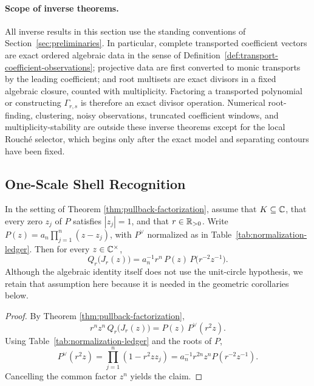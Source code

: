 \paragraph{Scope of inverse theorems.}\label{par:scope-of-inverse-theorems}
All inverse results in this section use the standing conventions of
Section~\ref{sec:preliminaries}.  In particular, complete transported
coefficient vectors are exact ordered algebraic data in the sense of
Definition~\ref{def:transport-coefficient-observations}; projective data
are first converted to monic transports by the leading coefficient; and
root multisets are exact divisors in a fixed algebraic closure, counted
with multiplicity.  Factoring a transported polynomial or constructing
\(\Gamma_{r,s}\) is therefore an exact divisor operation.  Numerical
root-finding, clustering, noisy observations, truncated coefficient
windows, and multiplicity-stability are outside these inverse theorems
except for the local Rouch\'e selector, which begins only after the exact
model and separating contours have been fixed.

\subsection{One-Scale Shell Recognition}\label{subsec:one-scale-shell-recognition}

\begin{corollary}\label{cor:leyang-transport-identity}
In the setting of Theorem \ref{thm:pullback-factorization}, assume that \(K\subseteq\mathbb{C}\), that every zero \(z_j\) of \(P\) satisfies \(|z_j|=1\), and that \(r\in\mathbb{R}_{>0}\).  Write \(P(z)=a_n\prod_{j=1}^{n}(z-z_j)\), with \(P^\vee\) normalized as in Table~\ref{tab:normalization-ledger}.
Then for every \(z\in\mathbb{C}^\times\),
\[
Q_r\!\bigl(J_r(z)\bigr)=a_n^{-1}r^n\,P(z)\,P\!\bigl(r^{-2}z^{-1}\bigr).
\]
Although the algebraic identity itself does not use the unit-circle hypothesis, we retain that assumption here because it is needed in the geometric corollaries below.
\end{corollary}

\begin{proof}
By Theorem \ref{thm:pullback-factorization},
\[
r^n z^n\,Q_r\!\bigl(J_r(z)\bigr)=P(z)\,P^{\vee}(r^2 z).
\]
Using Table~\ref{tab:normalization-ledger} and the roots of \(P\),
\[
P^{\vee}(r^2 z)
=\prod_{j=1}^{n}(1-r^2zz_j)
=a_n^{-1}r^{2n}z^n P(r^{-2}z^{-1}).
\]
Cancelling the common factor \(z^n\) yields the claim.
\end{proof}

